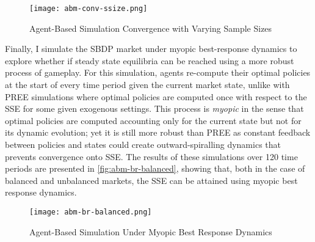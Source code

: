 \begin{figure}[ht] 
    \centering
    \caption{Agent-Based Simulation Convergence with Varying Sample Sizes}
    \texttt{[image: abm-conv-ssize.png]}
    \label{fig:abm-conv-ssize}
\end{figure} 

Finally, I simulate the SBDP market under myopic best-response dynamics to explore whether if steady state equilibria can be reached using a more robust process of gameplay. For this simulation, agents re-compute their optimal policies at the start of every time period given the current market state, unlike with PREE simulations where optimal policies are computed once with respect to the SSE for some given exogenous settings. This process is \textit{myopic} in the sense that optimal policies are computed accounting only for the current state but not for its dynamic evolution; yet it is still more robust than PREE as constant feedback between policies and states could create outward-spiralling dynamics that prevents convergence onto SSE. The results of these simulations over 120 time periods are presented in \autoref{fig:abm-br-balanced}, showing that, both in the case of balanced and unbalanced markets, the SSE can be attained using myopic best response dynamics.

\begin{figure}[ht] 
    \centering
    \caption{Agent-Based Simulation Under Myopic Best Response Dynamics}
    \texttt{[image: abm-br-balanced.png]}
    \label{fig:abm-br-balanced}
\end{figure}  


